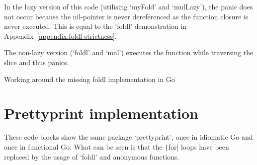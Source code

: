 In the lazy version of this code (utilising `myFold' and `mulLazy'), the panic does not occur because
the nil-pointer is never dereferenced as the function closure is never executed. This is equal
to the `foldl' demonstration in Appendix~\ref{appendix:foldl-strictness}.

The non-lazy version (`foldl' and `mul') executes the function while traversing the slice and thus panics.

\begin{code}
	\caption{Working around the missing foldl implementation in Go\label{code:foldl-go}}
\end{code}

\section{Prettyprint implementation}\label{appendix:prettyprint-func}

These code blocks show the same package `prettyprint', once in idiomatic Go and once
in functional Go. What can be seen is that the \texttt|for| loops have been replaced
by the usage of `foldl' and anonymous functions.

